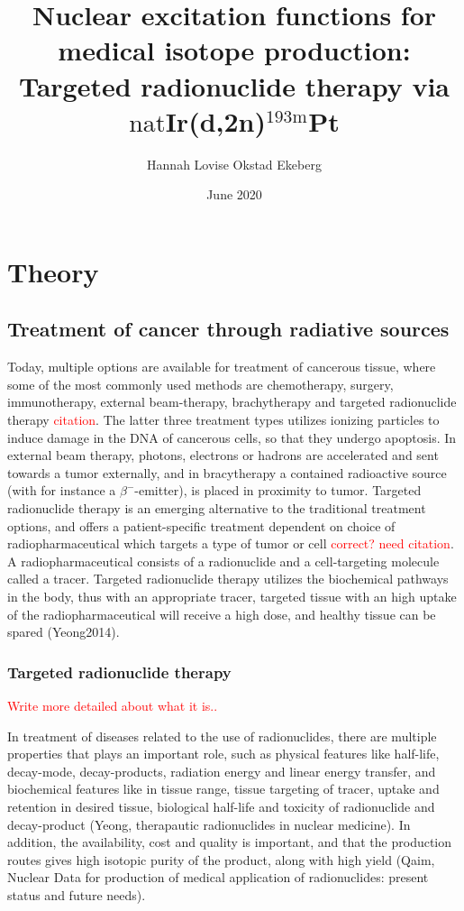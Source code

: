 \documentclass[a4paper,11pt,twoside]{book}
\title{Nuclear excitation functions for medical isotope production:\\
Targeted radionuclide therapy via $\text{nat}$Ir(d,2n)$^{193\text{m}}$Pt}
\author{Hannah Lovise Okstad Ekeberg}
\date{June 2020}
\begin{document}
\maketitle
\tableofcontents

\chapter{Theory}

\section{Treatment of cancer through radiative sources}

Today, multiple options are available for treatment of cancerous tissue, where some of the most commonly used methods are chemotherapy, surgery, immunotherapy, external beam-therapy, brachytherapy and targeted radionuclide therapy \textcolor{red}{citation}. The latter three treatment types utilizes ionizing particles to induce damage in the DNA of cancerous cells, so that they undergo apoptosis. In external beam therapy, photons, electrons or hadrons are accelerated and sent towards a tumor externally, and in bracytherapy a contained radioactive source (with for instance a $\beta^-$-emitter), is placed in proximity to tumor.  Targeted radionuclide therapy is an emerging alternative to the traditional treatment options, and offers a patient-specific treatment dependent on choice of radiopharmaceutical which targets a type of tumor or cell \textcolor{red}{correct? need citation}. A radiopharmaceutical consists of a radionuclide and a cell-targeting molecule called a tracer. Targeted radionuclide therapy utilizes the biochemical pathways in the body, thus with an appropriate tracer, targeted tissue with an high uptake of the radiopharmaceutical will receive a high dose, and healthy tissue can be spared (Yeong2014).\\ 

\noindent 

\subsection{Targeted radionuclide therapy}

\textcolor{red}{Write more detailed about what it is..}

In treatment of diseases related to the use of radionuclides, there are multiple properties that plays an important role, such as physical features like half-life, decay-mode, decay-products, radiation energy and linear energy transfer, and biochemical features like in tissue range, tissue targeting of tracer, uptake and retention in desired tissue, biological half-life and toxicity of radionuclide and decay-product (Yeong, therapautic radionuclides in nuclear medicine). In addition, the availability, cost and quality is important, and that the production routes gives high isotopic purity of the product, along with high yield (Qaim, Nuclear Data for production of medical application of radionuclides: present status and future needs). 
\end{document}
